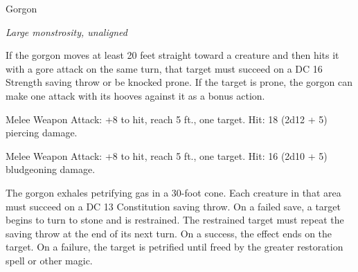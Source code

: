 \begin{monsterbox}{Gorgon}
\begin{hangingpar}
\textit{Large monstrosity, unaligned}
\end{hangingpar}
\dndline%
\basics[%
armorclass = 19,
hitpoints = 12d10 + 48,
speed = {40 ft.}
]
\dndline%
\stats[%
STR = \stat{20},
DEX = \stat{11},
CON = \stat{18},
INT = \stat{2},
WIS = \stat{12},
CHA = \stat{7}
]
\dndline%
\details[%
skills={Perception +4, },
damageimmunities={petrified},
savingthrows={},
conditionimmunities={},
damageresistances={},
damagevulnerabilities={},
senses={darkvision 60 ft., passive Perception 14},
challenge=5
]
\dndline%
\begin{monsteraction}
If the gorgon moves at least 20 feet straight toward a creature and then hits it with a gore attack on the same turn, that target must succeed on a DC 16 Strength saving throw or be knocked prone. If the target is prone, the gorgon can make one attack with its hooves against it as a bonus action.
\end{monsteraction}
\begin{monsteraction}[Gore]
Melee Weapon Attack: +8 to hit, reach 5 ft., one target. Hit: 18 (2d12 + 5) piercing damage.
\end{monsteraction}
\begin{monsteraction}[Hooves]
Melee Weapon Attack: +8 to hit, reach 5 ft., one target. Hit: 16 (2d10 + 5) bludgeoning damage.
\end{monsteraction}
\begin{monsteraction}
The gorgon exhales petrifying gas in a 30-foot cone. Each creature in that area must succeed on a DC 13 Constitution saving throw. On a failed save, a target begins to turn to stone and is restrained. The restrained target must repeat the saving throw at the end of its next turn. On a success, the effect ends on the target. On a failure, the target is petrified until freed by the greater restoration spell or other magic.
\end{monsteraction}
\end{monsterbox}